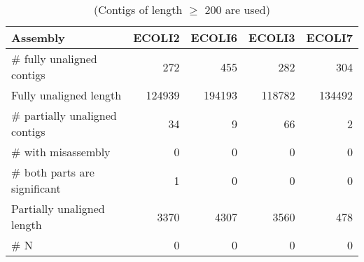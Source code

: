 \begin{table}[ht]
\begin{center}
\caption{(Contigs of length $\geq$ 200 are used)}
\begin{tabular}{|l*{4}{|r}|}
\hline
Assembly & ECOLI2 & ECOLI6 & ECOLI3 & ECOLI7 \\ \hline
\# fully unaligned contigs & 272 & 455 & 282 & 304 \\ \hline
Fully unaligned length & 124939 & 194193 & 118782 & 134492 \\ \hline
\# partially unaligned contigs & 34 & 9 & 66 & 2 \\ \hline
    \# with misassembly & 0 & 0 & 0 & 0 \\ \hline
    \# both parts are significant & 1 & 0 & 0 & 0 \\ \hline
Partially unaligned length & 3370 & 4307 & 3560 & 478 \\ \hline
\# N & 0 & 0 & 0 & 0 \\ \hline
\end{tabular}
\end{center}
\end{table}
